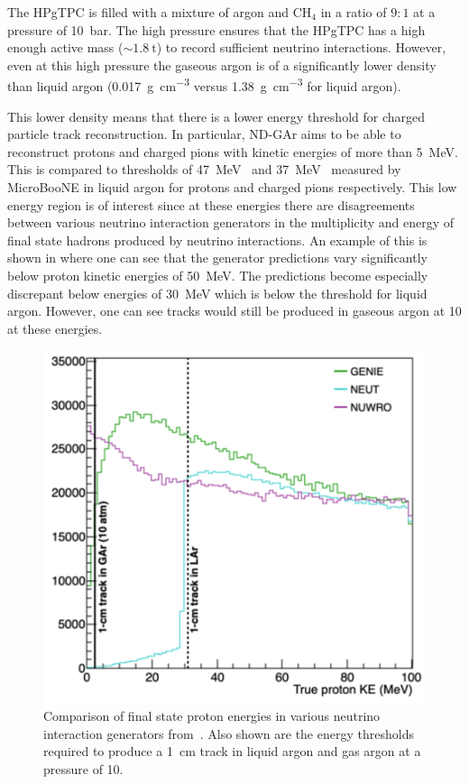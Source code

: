 The HPgTPC is filled with a mixture of argon and $\text{CH}_{4}$ in a ratio of $9:1$ at a pressure of \SI{10}{\bar}.
The high pressure ensures that the HPgTPC has a high enough active mass ($\sim\SI{1.8}{\tonne}$) to record sufficient neutrino interactions.
However, even at this high pressure the gaseous argon is of a significantly lower density than liquid argon (\SI{0.017}{\gram\per\cubic\centi\metre} versus \SI{1.38}{\gram\per\cubic\centi\metre} for liquid argon).

This lower density means that there is a lower energy threshold for charged particle track reconstruction.
In particular, ND-GAr aims to be able to reconstruct protons and charged pions with kinetic energies of more than \SI{5}{\mega\electronvolt}.
This is compared to thresholds of \SI{47}{\mega\electronvolt}~\cite{uBooneProtonThreshold} and \SI{37}{\mega\electronvolt}~\cite{uBoonePionThreshold} measured by MicroBooNE in liquid argon for protons and charged pions respectively.
This low energy region is of interest since at these energies there are disagreements between various neutrino interaction generators in the multiplicity and energy of final state hadrons produced by neutrino interactions.
An example of this is shown in  where one can see that the generator predictions vary significantly below proton kinetic energies of \SI{50}{\mega\electronvolt}.
The predictions become especially discrepant below energies of \SI{30}{\mega\electronvolt} which is below the threshold for liquid argon.
However, one can see tracks would still be produced in gaseous argon at \SI{10}{\atmosphere} at these energies.

\begin{figure}[h]
  \centering
  \includegraphics[width=.5\linewidth]{files/figures/dune_detector/generatorProtons}
  \caption[Comparison of final state proton kinetic energies in various neutrino interaction generators]{Comparison of final state proton energies in various neutrino interaction generators from~\cite{ndCdr}. Also shown are the energy thresholds required to produce a \SI{1}{\centi\metre} track in liquid argon and gas argon at a pressure of \SI{10}{\atmosphere}.}
  \label{fig:generatorProtons}
\end{figure}

